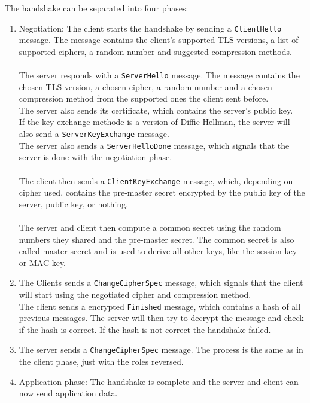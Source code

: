 The handshake can be separated into four phases:
\begin{enumerate}
    \item Negotiation: The client starts the handshake by sending a \texttt{ClientHello} message. The message contains the client's supported TLS versions, a list of supported ciphers, a random number and suggested compression methods.
    \\\\
    The server responds with a \texttt{ServerHello} message. The message contains the chosen TLS version, a chosen cipher, a random number and a chosen compression method from the supported ones the client sent before.
    \\
    The server also sends its certificate, which contains the server's public key.
    \\
    If the key exchange methode is a version of Diffie Hellman, the server will also send a \texttt{ServerKeyExchange} message.
    \\
    The server also sends a \texttt{ServerHelloDone} message, which signals that the server is done with the negotiation phase.
    \\\\
    The client then sends a \texttt{ClientKeyExchange} message, which, depending on cipher used, contains the pre-master secret encrypted by the public key of the server, public key, or nothing.
    \\\\
    The server and client then compute a common secret using the random numbers they shared and the pre-master secret. The common secret is also called master secret and is used to derive all other keys, like the session key or MAC key.
    \\
    \item The Clients sends a \texttt{ChangeCipherSpec} message, which signals that the client will start using the negotiated cipher and compression method.
    \\
    The client sends a encrypted \texttt{Finished} message, which contains a hash of all previous messages. The server will then try to decrypt the message and check if the hash is correct. If the hash is not correct the handshake failed.
    \\
    \item The server sends a \texttt{ChangeCipherSpec} message. The process is the same as in the client phase, just with the roles reversed.
    \\
    \item Application phase: The handshake is complete and the server and client can now send application data.
\end{enumerate}

